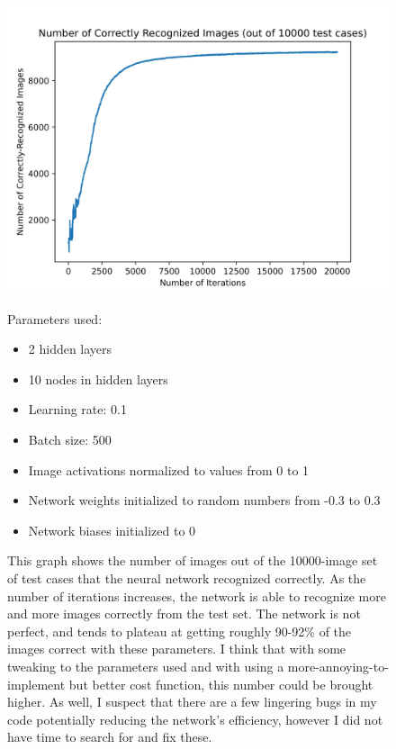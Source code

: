 \documentclass[12pt]{article}
\begin{document}
\begin{center}
    \begin{figure}[h!]
        \caption{
            This graph shows the number of images out of the 10000-image set of test cases that the neural network recognized correctly.
            As the number of iterations increases, the network is able to recognize more and more images correctly from the test set.
            The network is not perfect, and tends to plateau at getting roughly 90-92\% of the images correct with these parameters. 
            I think that with some tweaking to the parameters used and with using a more-annoying-to-implement but better cost function, this number could be brought higher.
            As well, I suspect that there are a few lingering bugs in my code potentially reducing the network's efficiency, however I did not have time to search for and fix these.
            \smallskip
        }
        \centering
        \includegraphics[scale=0.8]{test-2layer-10node-act0.3-2/network.png}

        Parameters used:
        \medskip
        \begin{itemize}
            \itemsep0em 
            \item 2 hidden layers
            \item 10 nodes in hidden layers
            \item Learning rate: 0.1
            \item Batch size: 500
            \item Image activations normalized to values from 0 to 1
            \item Network weights initialized to random numbers from -0.3 to 0.3
            \item Network biases initialized to 0 
        \end{itemize}
        \centering
    \end{figure}
\end{center}
\end{document}
